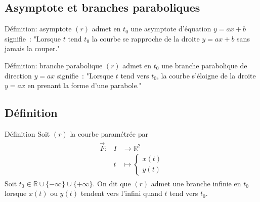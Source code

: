 \documentclass[14pt]{beamer}
\begin{document}
\subsection{Asymptote et branches paraboliques}
\begin{frame}

        \begin{alertblock}{Définition: asymptote}
                $(r)$ admet en $t_0$ une asymptote d'équation
                $y=ax+b$ signifie~: "Lorsque $t$ tend $t_0$
                la courbe se rapproche de la droite $y=ax+b$
                sans jamais la couper."
        \end{alertblock}
        \begin{alertblock}{Définition: branche parabolique}
                $(r)$ admet en $t_0$ une branche parabolique
                de direction $y=ax$ signifie~: "Lorsque $t$
                tend vers $t_0$, la courbe s'éloigne de la droite
                $y=ax$ en prenant la forme d'une parabole."
        \end{alertblock}
\end{frame}
\subsection{Définition}
\begin{frame}
        \begin{alertblock}{Définition}
                Soit $(r)$ la courbe paramétrée par
                \begin{align*}
                \begin{array}{lll}
                        \vec{F}: & I &\to \mathbb{R}^2\\
                        & t &\mapsto \left\{\begin{array}{l}x(t)\\y(t)\end{array}\right.
                \end{array}
                \end{align*}
                Soit $t_0\in\mathbb{R}\cup\{-\infty\}\cup\{+\infty\}$.
                On dit que $(r)$ admet une branche infinie en $t_0$
                lorsque $x(t)$ ou $y(t)$ tendent vers l'infini
                quand $t$ tend vers $t_0$.
        \end{alertblock}
\end{frame}
\end{document}
